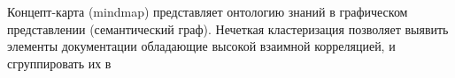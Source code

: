 
Концепт-карта (mindmap) представляет онтологию знаний в графическом
представлении (семантический граф). Нечеткая кластеризация позволяет выявить
элементы документации обладающие высокой взаимной корреляцией, и сгруппировать
их в 

\clearpage
{}
